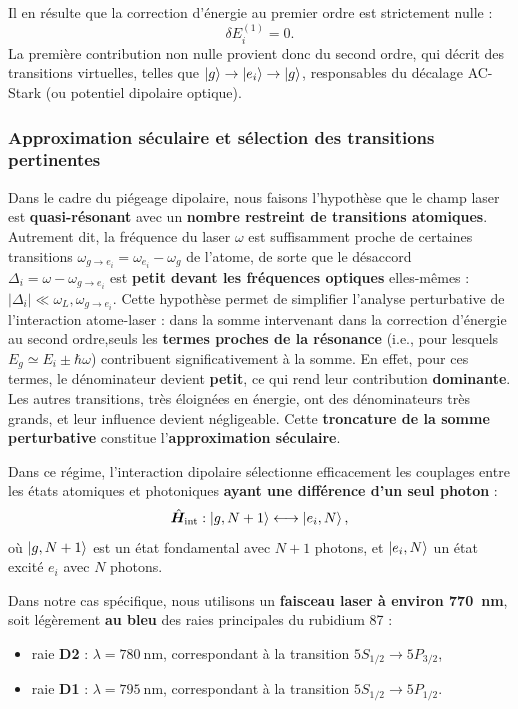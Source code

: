 \bigskip

\noindent Il en résulte que la correction d’énergie au premier ordre est strictement nulle :
\[
\delta E_i^{(1)} = 0.
\]
La première contribution non nulle provient donc du second ordre, qui décrit des transitions virtuelles, telles que \( \ket{g} \to \ket{e_i} \to \ket{g} \), responsables du décalage AC-Stark (ou potentiel dipolaire optique).

\subsubsection*{Approximation séculaire et sélection des transitions pertinentes}

Dans le cadre du piégeage dipolaire, nous faisons l’hypothèse que le champ laser est \textbf{quasi-résonant} avec un \textbf{nombre restreint de transitions atomiques}. Autrement dit, la fréquence du laser \( \omega \) est suffisamment proche de certaines transitions \( \omega_{g \rightarrow e_i} = \omega_{e_i} - \omega_g  \) de l’atome, de sorte que le désaccord \( \Delta_i = \omega - \omega_{g \rightarrow e_i} \) est \textbf{petit devant les fréquences optiques} elles-mêmes :
\(
|\Delta_i| \ll \omega_L, \omega_{g \rightarrow e_i}.
\)
Cette hypothèse permet de simplifier l’analyse perturbative de l’interaction atome-laser : dans la somme intervenant dans la correction d’énergie au second ordre,seuls les \textbf{termes proches de la résonance} (i.e., pour lesquels \( E_g \simeq E_i \pm \hbar \omega \)) contribuent significativement à la somme. En effet, pour ces termes, le dénominateur devient \textbf{petit}, ce qui rend leur contribution \textbf{dominante}. Les autres transitions, très éloignées en énergie, ont des dénominateurs très grands, et leur influence devient négligeable. Cette \textbf{troncature de la somme perturbative} constitue l’\textbf{approximation séculaire}.

Dans ce régime, l’interaction dipolaire sélectionne efficacement les couplages entre les états atomiques et photoniques \textbf{ayant une différence d’un seul photon} :
\[
\hat{\bm{H}}_{\text{int}} : \ket{g, N+1} \longleftrightarrow \ket{e_i, N},
\]
où \( \ket{g, N+1} \) est un état fondamental avec \( N+1 \) photons, et \( \ket{e_i, N} \) un état excité \( e_i \) avec \( N \) photons.

\medskip

Dans notre cas spécifique, nous utilisons un \textbf{faisceau laser à environ 770~nm}, soit légèrement \textbf{au bleu} des raies principales du rubidium 87 :
\begin{itemize}
  \item raie \textbf{D2} : \( \lambda = 780~\text{nm} \), correspondant à la transition \( 5S_{1/2} \rightarrow 5P_{3/2} \),
  \item raie \textbf{D1} : \( \lambda = 795~\text{nm} \), correspondant à la transition \( 5S_{1/2} \rightarrow 5P_{1/2} \).
\end{itemize}

